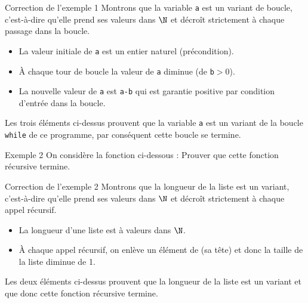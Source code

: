 \documentclass[10pt]{beamer}
\begin{document}
\begin{frame}[fragile]{\Ctitle}{\stitle}
	\begin{exampleblock}{Correction de l'exemple 1}
		\textcolor{OliveGreen}{Montrons que la variable {\tt a} est un variant de boucle, c'est-à-dire qu'elle prend ses valeurs dans $\N$ et  décroît strictement à chaque passage dans la boucle.}
		\begin{itemize}
			\item<2->{\textcolor{OliveGreen}{La valeur initiale de \texttt{a} est un entier naturel (précondition).}}
			\item<3->{\textcolor{OliveGreen}{\`{A} chaque tour de boucle la valeur de \texttt{a} diminue (de \texttt{b}$>0$).}}
			\item<4->{\textcolor{OliveGreen}{La nouvelle valeur de \texttt{a} est \texttt{a-b} qui est garantie positive par condition d'entrée dans la boucle.}}
		\end{itemize}
		\textcolor{OliveGreen}{Les trois éléments ci-dessus prouvent que la variable {\tt a} est un variant de la boucle {\tt while} de ce programme, par conséquent cette boucle se termine.}
	\end{exampleblock}
\end{frame}

\begin{frame}[fragile]{\Ctitle}{\stitle}
	\begin{exampleblock}{Exemple 2}
		On considère la fonction ci-dessous :
		\onslide<2-> Prouver que cette fonction récursive termine.
	\end{exampleblock}
\end{frame}

\begin{frame}[fragile]{\Ctitle}{\stitle}
	\begin{exampleblock}{Correction de l'exemple 2}
		\textcolor{OliveGreen}{Montrons que la longueur de la liste  est un variant, c'est-à-dire qu'elle prend ses valeurs dans $\N$ et  décroît strictement à chaque appel récursif.}
		\begin{itemize}
			\item<2->{\textcolor{OliveGreen}{La longueur d'une liste est à valeurs dans $\N$.}}
			\item<3->{\textcolor{OliveGreen}{\`{A} chaque appel récursif, on enlève un élément de  (sa tête) et donc la taille de la liste diminue de 1.}}
		\end{itemize}
		\textcolor{OliveGreen}{Les deux éléments ci-dessus prouvent que la longueur de la liste est un variant et que donc cette fonction récursive termine.}
	\end{exampleblock}
\end{frame}
\end{document}
